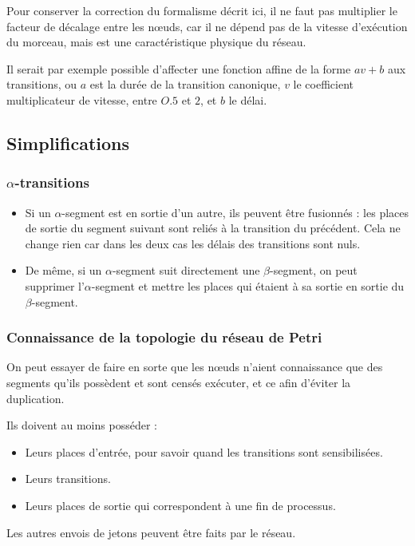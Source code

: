 Pour conserver la correction du formalisme décrit ici, il ne faut pas multiplier le facteur de décalage entre les nœuds, car il ne dépend pas de la vitesse d'exécution du morceau, mais est une caractéristique physique du réseau.

Il serait par exemple possible d'affecter une fonction affine de la forme $av + b$ aux transitions, ou $a$ est la durée de la transition canonique, $v$ le coefficient multiplicateur de vitesse, entre $O.5$ et $2$, et $b$ le délai. 

\subsection{Simplifications}
\subsubsection{$\alpha$-transitions}
\begin{itemize}
\item Si un $\alpha$-segment est en sortie d'un autre, ils peuvent être fusionnés : les places de sortie du segment suivant sont reliés à la transition du précédent. Cela ne change rien car dans les deux cas les délais des transitions sont nuls.

\item De même, si un $\alpha$-segment suit directement une $\beta$-segment, on peut supprimer l'$\alpha$-segment et mettre les places qui étaient à sa sortie en sortie du $\beta$-segment.
\end{itemize}
\subsubsection{Connaissance de la topologie du réseau de Petri}
On peut essayer de faire en sorte que les nœuds n'aient connaissance que des segments qu'ils possèdent et sont censés exécuter, et ce afin d'éviter la duplication.

Ils doivent au moins posséder : 
\begin{itemize}
\item Leurs places d'entrée, pour savoir quand les transitions sont sensibilisées.
\item Leurs transitions.
\item Leurs places de sortie qui correspondent à une fin de processus.
\end{itemize}

Les autres envois de jetons peuvent être faits par le réseau.

